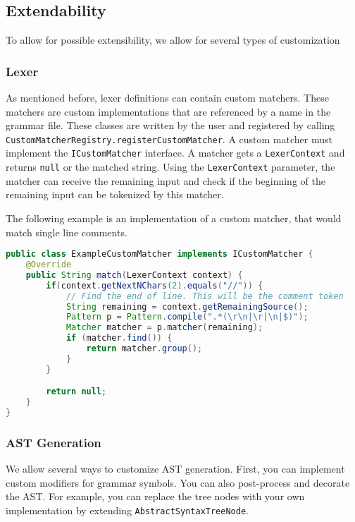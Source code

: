 \subsection{Extendability}

To allow for possible extensibility, we allow for several types of customization

\subsubsection{Lexer}

As mentioned before, lexer definitions can contain custom matchers. 
These matchers are custom implementations that are referenced by a name in the grammar file. 
These classes are written by the user and registered by calling \verb|CustomMatcherRegistry.registerCustomMatcher|. 
A custom matcher must implement the \verb|ICustomMatcher| interface. 
A matcher gets a \verb|LexerContext| and returns \verb|null| or the matched string. 
Using the \verb|LexerContext| parameter, the matcher can receive the remaining input and check if the beginning of the remaining input can be tokenized by this matcher.

The following example is an implementation of a custom matcher, that would match single line comments.

\begin{lstlisting}[language=Java, caption=Example of a custom matcher]
public class ExampleCustomMatcher implements ICustomMatcher {
    @Override
    public String match(LexerContext context) {
        if(context.getNextNChars(2).equals("//")) {
            // Find the end of line. This will be the comment token
            String remaining = context.getRemainingSource();
            Pattern p = Pattern.compile(".*(\r\n|\r|\n|$)");
            Matcher matcher = p.matcher(remaining);
            if (matcher.find()) {
                return matcher.group();
            }
        }

        return null;
    }
}
\end{lstlisting}

\subsubsection{AST Generation}

We allow several ways to customize AST generation. 
First, you can implement custom modifiers for grammar symbols.
You can also post-process and decorate the AST. 
For example, you can replace the tree nodes with your own implementation by extending \verb|AbstractSyntaxTreeNode|.

